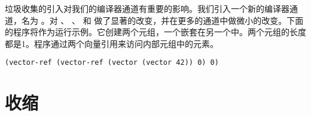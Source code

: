 \documentclass[11pt]{book}
\newtheorem{exercise}[theorem]{Exercise}
\begin{document}



垃圾收集的引入对我们的编译器通道有重要的影响。我们引入一个新的编译器通道，名为
 。对 
、 、 和
 做了显著的改变，并在更多的通道中做微小的改变。下面的程序将作为运行示例。它创建两个元组，一个嵌套在另一个中。两个元组的长度都是1。程序通过两个向量引用来访问内部元组中的元素。
\begin{lstlisting}
(vector-ref (vector-ref (vector (vector 42)) 0) 0)
\end{lstlisting}

\section{收缩}
\label{sec:shrink-Rvec}
\end{document}
